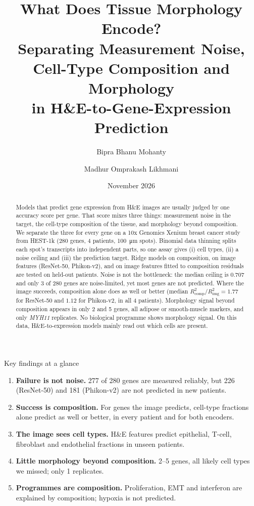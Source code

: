 \documentclass[11pt,a4paper]{article}
\title{\textbf{What Does Tissue Morphology Encode?}\\[2pt]
\large Separating Measurement Noise, Cell-Type Composition and Morphology\\ in H\&E-to-Gene-Expression Prediction}
\author{Bipra Bhanu Mohanty}
\author{Madhur Omprakash Likhmani}
\affil{DH607 Computational Multi-omics, IIT Bombay. Instructor: Prof.\ Saket Choudhary}
\date{November 2026}
\newcommand{\Rc}{R^2_{\mathrm{comp}}}
\newcommand{\Ri}{R^2_{\mathrm{img}}}
\begin{document}
\maketitle

\begin{abstract}
\noindent
Models that predict gene expression from H\&E images are usually judged by one accuracy score per gene. That score mixes three things: measurement noise in the target, the cell-type composition of the tissue, and morphology beyond composition. We separate the three for every gene on a 10x Genomics Xenium breast cancer study from HEST-1k (280 genes, 4 patients, \SI{100}{\micro\metre} spots). Binomial data thinning splits each spot's transcripts into independent parts, so one assay gives (i) cell types, (ii) a noise ceiling and (iii) the prediction target. Ridge models on composition, on image features (ResNet-50, Phikon-v2), and on image features fitted to composition residuals are tested on held-out patients. Noise is not the bottleneck: the median ceiling is $0.707$ and only 3 of 280 genes are noise-limited, yet most genes are not predicted. Where the image succeeds, composition alone does as well or better (median $\Rc/\Ri = 1.77$ for ResNet-50 and $1.12$ for Phikon-v2, in all 4 patients). Morphology signal beyond composition appears in only 2 and 5 genes, all adipose or smooth-muscle markers, and only \textit{MYH11} replicates. No biological programme shows morphology signal. On this data, H\&E-to-expression models mainly read out which cells are present.
\end{abstract}

\begin{keybox}{Key findings at a glance}
\begin{enumerate}[leftmargin=*]
  \item \textbf{Failure is not noise.} 277 of 280 genes are measured reliably, but 226 (ResNet-50) and 181 (Phikon-v2) are not predicted in new patients.
  \item \textbf{Success is composition.} For genes the image predicts, cell-type fractions alone predict as well or better, in every patient and for both encoders.
  \item \textbf{The image sees cell types.} H\&E features predict epithelial, T-cell, fibroblast and endothelial fractions in unseen patients.
  \item \textbf{Little morphology beyond composition.} 2--5 genes, all likely cell types we missed; only 1 replicates.
  \item \textbf{Programmes are composition.} Proliferation, EMT and interferon are explained by composition; hypoxia is not predicted.
\end{enumerate}
\end{keybox}
\end{document}
